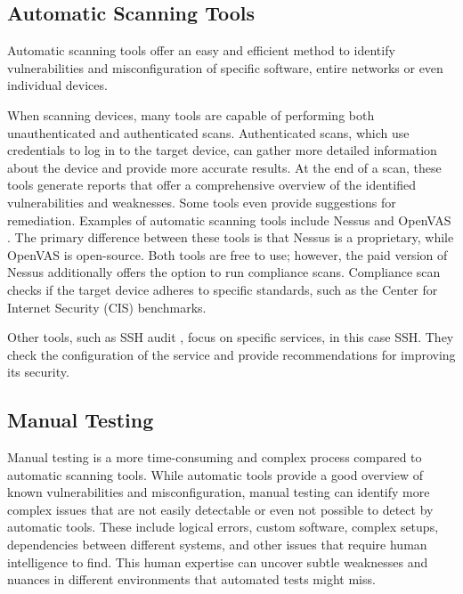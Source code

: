 \subsection{Automatic Scanning Tools}
Automatic scanning tools offer an easy and efficient method to identify vulnerabilities and misconfiguration of specific software, entire networks or even individual devices.

When scanning devices, many tools are capable of performing both unauthenticated and authenticated scans.
Authenticated scans, which use credentials to log in to the target device, can gather more detailed information about the device and provide more accurate results.
At the end of a scan, these tools generate reports that offer a comprehensive overview of the identified vulnerabilities and weaknesses.
Some tools even provide suggestions for remediation.
Examples of automatic scanning tools include Nessus \cite{nessus} and OpenVAS \cite{openvas}.
The primary difference between these tools is that Nessus is a proprietary, while OpenVAS is open-source.
Both tools are free to use; however, the paid version of Nessus additionally offers the option to run compliance scans.
Compliance scan checks if the target device adheres to specific standards, such as the Center for Internet Security (CIS) benchmarks.

Other tools, such as SSH audit \cite{sshaudit}, focus on specific services, in this case SSH.
They check the configuration of the service and provide recommendations for improving its security.
\newpage

\subsection{Manual Testing}
Manual testing is a more time-consuming and complex process compared to automatic scanning tools.
While automatic tools provide a good overview of known vulnerabilities and misconfiguration, manual testing can identify more complex issues that are not easily detectable or even not possible to detect by automatic tools.
These include logical errors, custom software, complex setups, dependencies between different systems, and other issues that require human intelligence to find.
This human expertise can uncover subtle weaknesses and nuances in different environments that automated tests might miss.

